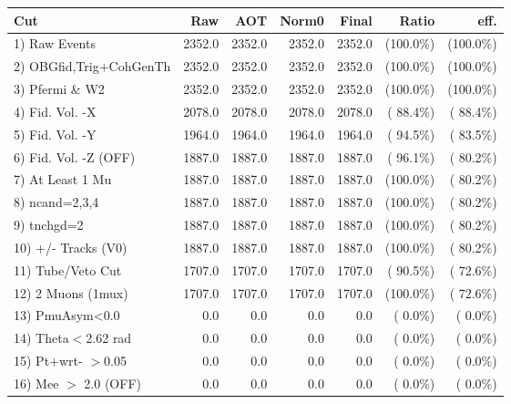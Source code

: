  \begin{table}[h!]\centering
 \begin{tabular}{||l||r|r|r|r|r|r||}
 \hline
 \hline
 Cut & Raw & AOT & Norm0 & Final & Ratio & eff.       \\
 \hline
  1) Raw Events           &       2352.0 &       2352.0 &       2352.0 &       2352.0 & (100.0\%) & (100.0\%) \\
  2) OBGfid,Trig+CohGenTh &       2352.0 &       2352.0 &       2352.0 &       2352.0 & (100.0\%) & (100.0\%) \\
  3) Pfermi \& W2         &       2352.0 &       2352.0 &       2352.0 &       2352.0 & (100.0\%) & (100.0\%) \\
  4) Fid. Vol. -X         &       2078.0 &       2078.0 &       2078.0 &       2078.0 & ( 88.4\%) & ( 88.4\%) \\
  5) Fid. Vol. -Y         &       1964.0 &       1964.0 &       1964.0 &       1964.0 & ( 94.5\%) & ( 83.5\%) \\
  6) Fid. Vol. -Z (OFF)   &       1887.0 &       1887.0 &       1887.0 &       1887.0 & ( 96.1\%) & ( 80.2\%) \\
  7) At Least 1 Mu        &       1887.0 &       1887.0 &       1887.0 &       1887.0 & (100.0\%) & ( 80.2\%) \\
  8) ncand=2,3,4          &       1887.0 &       1887.0 &       1887.0 &       1887.0 & (100.0\%) & ( 80.2\%) \\
  9) tnchgd=2             &       1887.0 &       1887.0 &       1887.0 &       1887.0 & (100.0\%) & ( 80.2\%) \\
 10) +/- Tracks (V0)      &       1887.0 &       1887.0 &       1887.0 &       1887.0 & (100.0\%) & ( 80.2\%) \\
 11) Tube/Veto Cut        &       1707.0 &       1707.0 &       1707.0 &       1707.0 & ( 90.5\%) & ( 72.6\%) \\
 12) 2 Muons (1mux)       &       1707.0 &       1707.0 &       1707.0 &       1707.0 & (100.0\%) & ( 72.6\%) \\
 13) PmuAsym<0.0          &          0.0 &          0.0 &          0.0 &          0.0 & (  0.0\%) & (  0.0\%) \\
 14) Theta$<$2.62 rad     &          0.0 &          0.0 &          0.0 &          0.0 & (  0.0\%) & (  0.0\%) \\
 15) Pt+wrt- $>$0.05      &          0.0 &          0.0 &          0.0 &          0.0 & (  0.0\%) & (  0.0\%) \\
 16) Mee $>$ 2.0  (OFF)   &          0.0 &          0.0 &          0.0 &          0.0 & (  0.0\%) & (  0.0\%) \\

\end{tabular}
\end{table}
